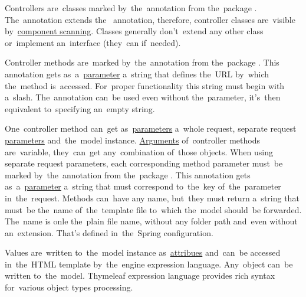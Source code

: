 \noindent Controllers are~classes marked by~the~annotation  from the~package .
The~annotation extends the~ annotation, therefore, controller classes are~visible by~\hyperref[iocannotations]{component scanning}.
Classes generally don't~extend any other class or~implement an~interface (they~can if~needed).

Controller methods are~marked by~the~annotation  from the~package .
This annotation gets as~a~\hyperref[parameterargument]{parameter} a~string that defines the~URL by~which the~method is~accessed.
For~proper functionality this string must begin with a~slash.
The~annotation can~be used even without the~parameter, it's~then equivalent to~specifying an~empty string.

One~controller method can~get as~\hyperref[parameterargument]{parameters} a~whole request, separate request \hyperref[jspattributeparameter]{parameters} and~the~model instance.
\hyperref[parameterargument]{Arguments} of~controller methods are~variable, they~can~get any~combination of~those objects.
When using separate request parameters, each corresponding method parameter must~be marked by~the~annotation  from the~package .
This annotation gets as~a~\hyperref[parameterargument]{parameter} a~string that must correspond to~the~key of~the~parameter in~the~request.
Methods can~have any name, but~they must return a~string that must~be the~name of~the~template file to~which the~model should~be forwarded.
The~name is onle the~plain file name, without any folder path and~even without an~extension. That's defined in~the~Spring configuration.

Values are~written to~the~model instance as~\hyperref[jspattributeparameter]{attribues} and~can~be accessed in~the~HTML template by~the~engine expression language.
Any~object can~be written to~the~model.
Thymeleaf expression language provides rich syntax for~various object types processing.
\newpage

